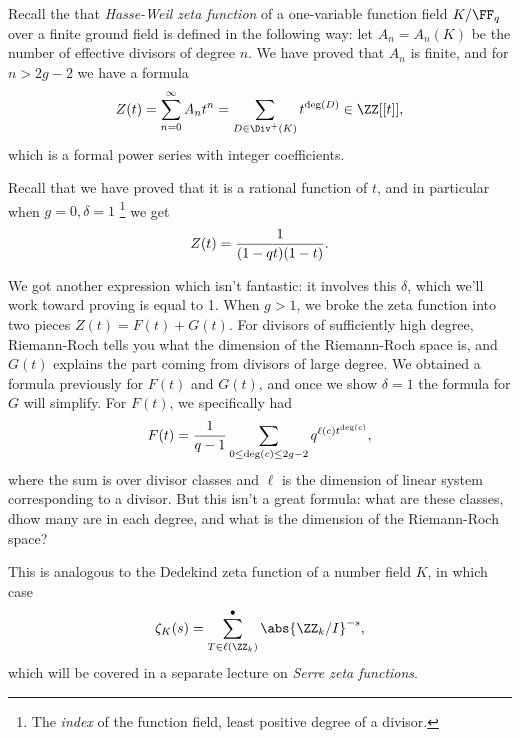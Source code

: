 Recall the that \emph{Hasse-Weil zeta function} of a one-variable
function field \(K/\FF_q\) over a finite ground field is defined in the
following way: let \(A_n = A_n(K)\) be the number of effective divisors
of degree \(n\). We have proved that \(A_n\) is finite, and for
\(n>2g-2\) we have a formula
\begin{align*}  
Z(t) = \sum_{n=0}^\infty A_n t^n
= \sum_{D\in \Div^+(K)} t^{\deg(D)} \in \ZZ[[t]]
,\end{align*} which is a formal power series with integer coefficients.

\begin{remark}

Recall that we have proved that it is a rational function of \(t\), and
in particular when \(g=0, \delta = 1\) \footnote{The \emph{index} of the
  function field, least positive degree of a divisor.} we get
\begin{align*}  
Z(t) = {1 \over (1-qt)(1-t)}
.\end{align*}

We got another expression which isn't fantastic: it involves this
\(\delta\), which we'll work toward proving is equal to 1. When \(g>1\),
we broke the zeta function into two pieces \(Z(t) = F(t) + G(t)\). For
divisors of sufficiently high degree, Riemann-Roch tells you what the
dimension of the Riemann-Roch space is, and \(G(t)\) explains the part
coming from divisors of large degree. We obtained a formula previously
for \(F(t)\) and \(G(t)\), and once we show \(\delta=1\) the formula for
\(G\) will simplify. For \(F(t)\), we specifically had
\begin{align*}  
F(t) = {1\over q-1} \sum_{0\leq \deg(c) \leq 2g-2} q^{\ell(c) t^{\deg(c)}}
,\end{align*} where the sum is over divisor classes and \(\ell\) is the
dimension of linear system corresponding to a divisor. But this isn't a
great formula: what are these classes, dhow many are in each degree, and
what is the dimension of the Riemann-Roch space?

\end{remark}

\begin{remark}

This is analogous to the Dedekind zeta function of a number field \(K\),
in which case
\begin{align*}  
\zeta_K(s) = \sum_{T\in \ell(\ZZ_k)}^\bullet \abs{\ZZ_k/I}^{-s}
,\end{align*} which will be covered in a separate lecture on \emph{Serre
zeta functions}.

\end{remark}

